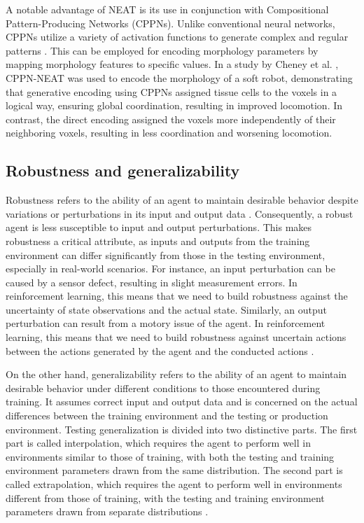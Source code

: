         A notable advantage of NEAT is its use in conjunction with Compositional Pattern-Producing Networks (CPPNs). Unlike conventional neural networks, CPPNs utilize a variety of activation functions to generate complex and regular patterns \cite{Stanley_2007}. This can be employed for encoding morphology parameters by mapping morphology features to specific values. In a study by Cheney et al. \cite{Cheney_2014}, CPPN-NEAT was used to encode the morphology of a soft robot, demonstrating that generative encoding using CPPNs assigned tissue cells to the voxels in a logical way, ensuring global coordination, resulting in improved locomotion. In contrast, the direct encoding assigned the voxels more independently of their neighboring voxels, resulting in less coordination and worsening locomotion.

\subsection{Robustness and generalizability}
    Robustness refers to the ability of an agent to maintain desirable behavior despite variations or perturbations in its input and output data \cite{Ravi_Mangal_2019, Charles_Packer_2019, Xu_Mengdi_2022}. Consequently, a robust agent is less susceptible to input and output perturbations. This makes robustness a critical attribute, as inputs and outputs from the training environment can differ significantly from those in the testing environment, especially in real-world scenarios. For instance, an input perturbation can be caused by a sensor defect, resulting in slight measurement errors. In reinforcement learning, this means that we need to build robustness against the uncertainty of state observations and the actual state. Similarly, an output perturbation can result from a motory issue of the agent. In reinforcement learning, this means that we need to build robustness against uncertain actions between the actions generated by the agent and the conducted actions \cite{Xu_Mengdi_2022}. 

    On the other hand, generalizability refers to the ability of an agent to maintain desirable behavior under different conditions to those encountered during training. It assumes correct input and output data and is concerned on the actual differences between the training environment and the testing or production environment. Testing generalization is divided into two distinctive parts. The first part is called interpolation, which requires the agent to perform well in environments similar to those of training, with both the testing and training environment parameters drawn from the same distribution. The second part is called extrapolation, which requires the agent to perform well in environments different from those of training, with the testing and training environment parameters drawn from separate distributions \cite{Charles_Packer_2019, Xu_Mengdi_2022}.

